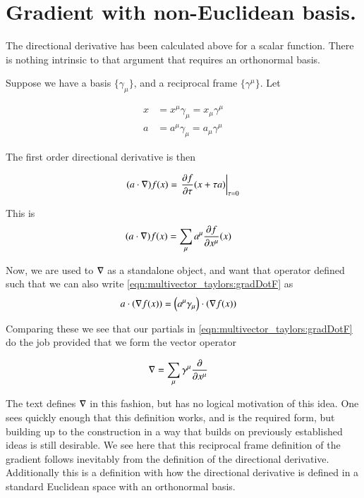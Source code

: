 \section{Gradient with non-Euclidean basis. }

The directional derivative has been calculated above for a scalar function.  There is nothing intrinsic to that argument
that requires an orthonormal basis.

Suppose we have a basis $\{\gamma_\mu\}$, and a reciprocal frame $\{\gamma^\mu\}$.  Let

\begin{align*}
x &= x^\mu \gamma_\mu = x_\mu \gamma^\mu \\
a &= a^\mu \gamma_\mu = a_\mu \gamma^\mu 
\end{align*}

The first order directional derivative is then 

\begin{align*}
(a \cdot \grad) f(x) 
&=
\left. \PD{\tau}{f}(x + \tau a) \right\vert_{\tau=0} \\
\end{align*}

This is
\begin{align}\label{eqn:multivector_taylors:gradDotF}
(a \cdot \grad) f(x) &= \sum_\mu a^\mu \PD{x^\mu}{f}(x) 
\end{align}

Now, we are used to $\grad$ as a standalone object, and want that operator defined such that we can also write \ref{eqn:multivector_taylors:gradDotF}
as
\begin{align*}
a \cdot (\grad f(x))
&=
\left(a^\mu \gamma_\mu \right) \cdot (\grad f(x))
\end{align*}

Comparing these we see that our partials in \ref{eqn:multivector_taylors:gradDotF} do the job provided that we form the vector operator

\begin{align}\label{eqn:multivector_taylors:gradForNonOrtho}
\grad &= \sum_\mu \gamma^\mu \PD{x^\mu}{}
\end{align}

The text \citep{doran2003gap} defines $\grad$ in this fashion, but has no logical motivation of this idea.  One sees
quickly enough that this definition works, and is the required form, but building up to the construction
in a way that builds on previously established ideas is still desirable.
We see here that this reciprocal frame definition of the gradient follows inevitably from the definition
of the directional derivative.  Additionally this is a definition with how 
the directional derivative is defined in a standard Euclidean space with an orthonormal basis.

